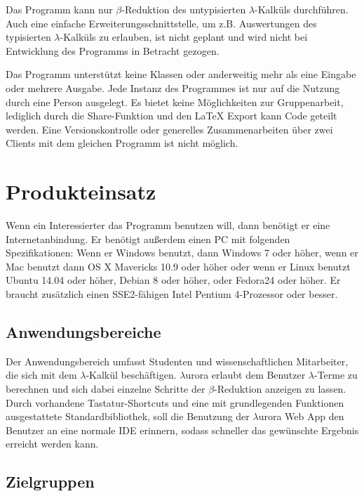 \documentclass[parskip=full,11pt,twoside]{scrartcl}
\begin{document}
Das Programm kann nur $\beta$-Reduktion des untypisierten $\lambda$-Kalküls durchführen. Auch eine einfache Erweiterungsschnittstelle, um z.B. Auswertungen des typisierten $\lambda$-Kalküls zu erlauben, ist nicht geplant und wird nicht bei Entwicklung des Programms in Betracht gezogen.

Das Programm unterstützt keine Klassen oder anderweitig mehr als eine Eingabe oder mehrere Ausgabe.
Jede Instanz des Programmes ist nur auf die Nutzung durch eine Person ausgelegt. Es bietet keine Möglichkeiten zur Gruppenarbeit, lediglich durch die Share-Funktion und den LaTeX Export kann Code geteilt werden.
\newline
Eine Versionskontrolle oder generelles Zusammenarbeiten über zwei Clients mit dem gleichen Programm ist nicht möglich.



\newpage
\section{Produkteinsatz}

Wenn ein Interessierter das Programm benutzen will, dann benötigt er eine Internetanbindung. Er benötigt außerdem einen PC mit folgenden Spezifikationen: Wenn er Windows benutzt, dann Windows 7 oder höher, wenn er Mac benutzt dann OS X Mavericks 10.9 oder höher oder wenn er Linux benutzt Ubuntu 14.04 oder höher, Debian 8 oder höher, oder Fedora24 oder höher.
Er braucht zusätzlich einen SSE2-fähigen Intel Pentium 4-Prozessor oder besser.

\subsection{Anwendungsbereiche}

Der Anwendungsbereich umfasst Studenten und wissenschaftlichen Mitarbeiter, die sich mit dem $\lambda$-Kalkül beschäftigen. $\lambda$urora erlaubt dem Benutzer $\lambda$-Terme zu berechnen und sich dabei einzelne Schritte der $\beta$-Reduktion anzeigen zu lassen. Durch vorhandene Tastatur-Shortcuts und eine mit grundlegenden Funktionen ausgestattete Standardbibliothek, soll die Benutzung der $\lambda$urora Web App den Benutzer an eine normale IDE erinnern, sodass schneller das gewünschte Ergebnis erreicht werden kann.

\subsection{Zielgruppen}
\end{document}

